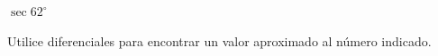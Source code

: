 \item $\sec 62^\circ$
\par
Utilice diferenciales para encontrar un valor aproximado al número indicado.
